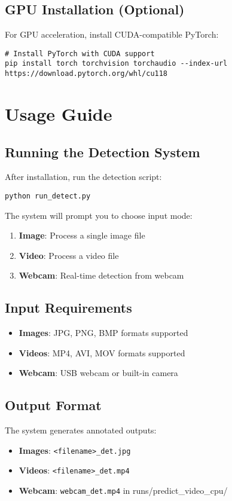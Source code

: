 \documentclass[12pt,a4paper]{article}
\begin{document}
\subsection{GPU Installation (Optional)}
For GPU acceleration, install CUDA-compatible PyTorch:

\begin{lstlisting}[caption=GPU Installation]
# Install PyTorch with CUDA support
pip install torch torchvision torchaudio --index-url https://download.pytorch.org/whl/cu118
\end{lstlisting}

\section{Usage Guide}

\subsection{Running the Detection System}
After installation, run the detection script:

\begin{lstlisting}[caption=Running Detection]
python run_detect.py
\end{lstlisting}

The system will prompt you to choose input mode:
\begin{enumerate}
    \item \textbf{Image}: Process a single image file
    \item \textbf{Video}: Process a video file
    \item \textbf{Webcam}: Real-time detection from webcam
\end{enumerate}

\subsection{Input Requirements}
\begin{itemize}
    \item \textbf{Images}: JPG, PNG, BMP formats supported
    \item \textbf{Videos}: MP4, AVI, MOV formats supported
    \item \textbf{Webcam}: USB webcam or built-in camera
\end{itemize}

\subsection{Output Format}
The system generates annotated outputs:
\begin{itemize}
    \item \textbf{Images}: \texttt{<filename>\_det.jpg}
    \item \textbf{Videos}: \texttt{<filename>\_det.mp4}
    \item \textbf{Webcam}: \texttt{webcam\_det.mp4} in runs/predict\_video\_cpu/
\end{itemize}
\end{document}
